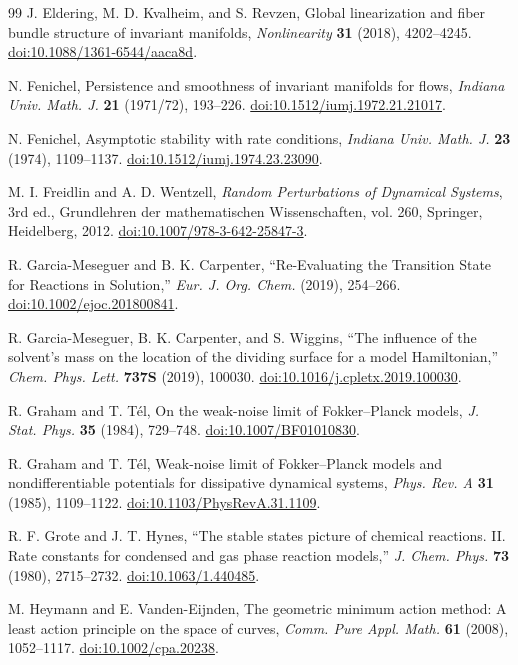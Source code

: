 \documentclass[11pt]{article}
\theoremstyle{definition}
\theoremstyle{remark}
\newcommand{\doi}[1]{\href{https://doi.org/#1}{doi:#1}}
\begin{document}
\begin{thebibliography}{99}
J. Eldering, M. D. Kvalheim, and S. Revzen,
Global linearization and fiber bundle structure of invariant manifolds,
\emph{Nonlinearity} \textbf{31} (2018), 4202--4245.
\doi{10.1088/1361-6544/aaca8d}.

N. Fenichel,
Persistence and smoothness of invariant manifolds for flows,
\emph{Indiana Univ. Math. J.} \textbf{21} (1971/72), 193--226.
\doi{10.1512/iumj.1972.21.21017}.

N. Fenichel,
Asymptotic stability with rate conditions,
\emph{Indiana Univ. Math. J.} \textbf{23} (1974), 1109--1137.
\doi{10.1512/iumj.1974.23.23090}.

M. I. Freidlin and A. D. Wentzell,
\emph{Random Perturbations of Dynamical Systems},
3rd ed., Grundlehren der mathematischen Wissenschaften, vol. 260,
Springer, Heidelberg, 2012.
\doi{10.1007/978-3-642-25847-3}.

R. Garcia-Meseguer and B. K. Carpenter,
``Re-Evaluating the Transition State for Reactions in Solution,''
\emph{Eur. J. Org. Chem.} (2019), 254--266.
\doi{10.1002/ejoc.201800841}.

R. Garcia-Meseguer, B. K. Carpenter, and S. Wiggins,
``The influence of the solvent's mass on the location of the dividing surface for a model Hamiltonian,''
\emph{Chem. Phys. Lett.} \textbf{737S} (2019), 100030.
\doi{10.1016/j.cpletx.2019.100030}.

R. Graham and T. T\'el,
On the weak-noise limit of Fokker--Planck models,
\emph{J. Stat. Phys.} \textbf{35} (1984), 729--748.
\doi{10.1007/BF01010830}.

R. Graham and T. T\'el,
Weak-noise limit of Fokker--Planck models and nondifferentiable potentials for dissipative dynamical systems,
\emph{Phys. Rev. A} \textbf{31} (1985), 1109--1122.
\doi{10.1103/PhysRevA.31.1109}.

R. F. Grote and J. T. Hynes,
``The stable states picture of chemical reactions. II. Rate constants for condensed and gas phase reaction models,''
\emph{J. Chem. Phys.} \textbf{73} (1980), 2715--2732.
\doi{10.1063/1.440485}.

M. Heymann and E. Vanden-Eijnden,
The geometric minimum action method: A least action principle on the space of curves,
\emph{Comm. Pure Appl. Math.} \textbf{61} (2008), 1052--1117.
\doi{10.1002/cpa.20238}.


\end{thebibliography}
\end{document}
